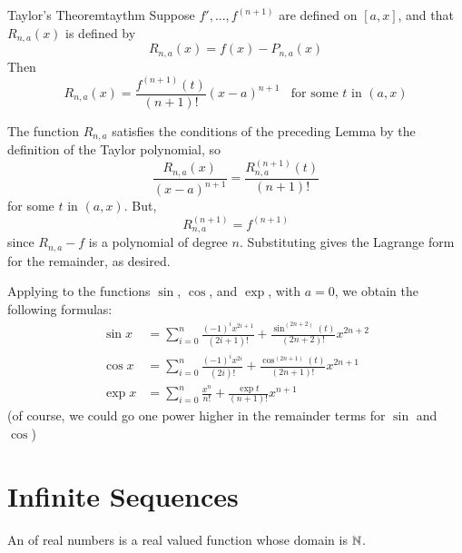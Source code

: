 \documentclass[12pt]{report}
\begin{document}
\begin{namthm}{Taylor's Theorem}{taythm}
    Suppose $f',...,f^{(n+1)}$ are defined on $[a,x]$, and that $R_{n,a}(x)$ is defined by \begin{equation*}
        R_{n,a}(x) = f(x) - P_{n,a}(x)
    \end{equation*}
    Then \begin{equation*}
        R_{n,a}(x) = \frac{f^{(n+1)}(t)}{(n+1)!}(x-a)^{n+1}\;\;\text{ for some $t$ in } (a,x)
    \end{equation*}
\end{namthm}
\begin{proof*}{}{}
    The function $R_{n,a}$ satisfies the conditions of the preceding Lemma by the definition of the Taylor polynomial, so \begin{equation*}
        \frac{R_{n,a}(x)}{(x-a)^{n+1}} = \frac{R_{n,a}^{(n+1)}(t)}{(n+1)!}
    \end{equation*}
    for some $t$ in $(a,x)$. But, \begin{equation*}
        R_{n,a}^{(n+1)} = f^{(n+1)}
    \end{equation*}
    since $R_{n,a} - f$ is a polynomial of degree $n$. Substituting gives the Lagrange form for the remainder, as desired.
\end{proof*}

\begin{eg*}{}{}
    Applying  to the functions $\sin$, $\cos$, and $\exp$, with $a = 0$, we obtain the following formulas: \begin{align*}
        \sin x &= \sum\limits_{i=0}^n\frac{(-1)^ix^{2i+1}}{(2i+1)!} + \frac{\sin^{(2n+2)}(t)}{(2n+2)!}x^{2n+2} \\
        \cos x &= \sum\limits_{i=0}^n\frac{(-1)^ix^{2i}}{(2i)!} + \frac{\cos^{(2n+1)}(t)}{(2n+1)!}x^{2n+1} \\
        \exp x &= \sum\limits_{i=0}^n\frac{x^n}{n!} + \frac{\exp t}{(n+1)!}x^{n+1}
    \end{align*}
    (of course, we could go one power higher in the remainder terms for $\sin$ and $\cos$)
\end{eg*}


\section{Infinite Sequences}

\begin{defn}{}{}
    An  of real numbers is a real valued function whose domain is $\mathbb N$.
\end{defn}
\end{document}
